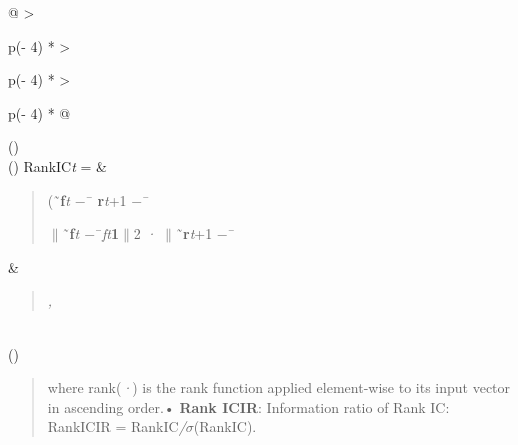 \documentclass[
]{article}
\begin{document}
\begin{longtable}[]{@{}
  >{\raggedright\arraybackslash}p{(\columnwidth - 4\tabcolsep) * }
  >{\raggedright\arraybackslash}p{(\columnwidth - 4\tabcolsep) * }
  >{\raggedright\arraybackslash}p{(\columnwidth - 4\tabcolsep) * }@{}}
\toprule()
 \\
\midrule()
\endhead
RankIC\emph{t} = & \begin{minipage}[t]{\linewidth}\raggedright
\begin{quote}
(˜\textbf{f}\emph{t $-$}¯ \textbf{r}\emph{t}+1 \emph{$-$}¯

\emph{$\|$}˜\textbf{f}\emph{t $-$}¯\emph{ft}\textbf{1}\emph{$\|$}2 \emph{·
$\|$}˜\textbf{r}\emph{t}+1 \emph{$-$}¯
\end{quote}
\end{minipage} & \begin{minipage}[t]{\linewidth}\raggedright
\begin{quote}
\emph{,}
\end{quote}
\end{minipage} \\
\bottomrule()
\end{longtable}

\begin{quote}
where rank(\emph{·}) is the rank function applied element-wise to its
input vector in ascending order.• \textbf{Rank ICIR}: Information ratio
of Rank IC: RankICIR = RankIC\emph{/$\sigma$}(RankIC).
\end{quote}
\end{document}
